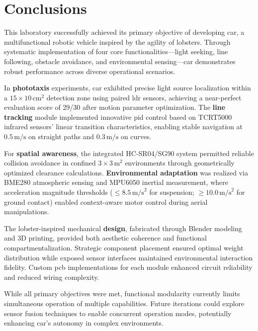 \documentclass[../main]{subfiles}
\begin{document}
\chapter{Conclusions}
\label{ch:conclusions}

This laboratory successfully achieved its primary objective of developing \gls{car}, a multifunctional robotic vehicle inspired by the agility of lobsters. Through systematic implementation of four core functionalities—light seeking, line following, obstacle avoidance, and environmental sensing—\gls{car} demonstrates robust performance across diverse operational scenarios. 

In \textbf{phototaxis} experiments, \gls{car} exhibited precise light source localization within a $15 \times 10\,\text{cm}^2$ detection zone using paired \gls{ldr} sensors, achieving a near-perfect evaluation score of 29/30 after motion parameter optimization. The \textbf{line tracking} module implemented innovative \gls{pid} control based on TCRT5000 infrared sensors' linear transition characteristics, enabling stable navigation at $0.5\,\text{m/s}$ on straight paths and $0.3\,\text{m/s}$ on curves. 

For \textbf{spatial awareness}, the integrated HC-SR04/SG90 system permitted reliable collision avoidance in confined $3\times3\,\text{m}^2$ environments through geometrically optimized clearance calculations. \textbf{Environmental adaptation} was realized via BME280 atmospheric sensing and MPU6050 inertial measurement, where acceleration magnitude thresholds ($\leq 8.5\,\text{m/s}^2$ for suspension; $\geq 10.0\,\text{m/s}^2$ for ground contact) enabled context-aware motor control during aerial manipulations.

The lobster-inspired mechanical \textbf{design}, fabricated through Blender modeling and 3D printing, provided both aesthetic coherence and functional compartmentalization. Strategic component placement ensured optimal weight distribution while exposed sensor interfaces maintained environmental interaction fidelity. Custom \gls{pcb} implementations for each module enhanced circuit reliability and reduced wiring complexity.

While all primary objectives were met, functional modularity currently limits simultaneous operation of multiple capabilities. Future iterations could explore sensor fusion techniques to enable concurrent operation modes, potentially enhancing \gls{car}'s autonomy in complex environments.
\end{document}
